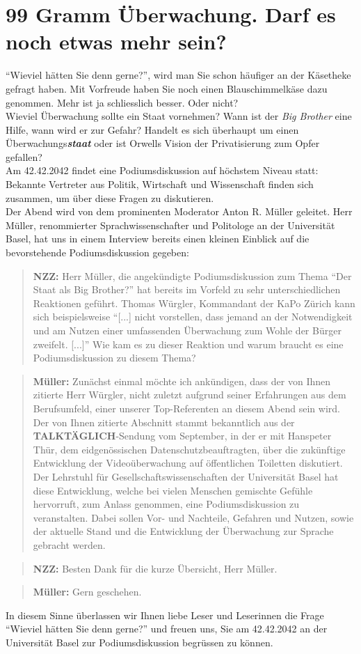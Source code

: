 \section*{99 Gramm Überwachung. Darf es noch etwas mehr sein?}
"`Wieviel hätten Sie denn gerne?"', wird man Sie schon
häufiger an der Käsetheke gefragt haben. Mit Vorfreude haben
Sie noch einen Blauschimmelkäse dazu genommen. Mehr ist ja
schliesslich besser. Oder nicht?\\
Wieviel Überwachung sollte ein Staat vornehmen? Wann ist
der \textit{Big Brother} eine Hilfe, wann wird er zur Gefahr?
Handelt es sich überhaupt um einen Überwachungs\textbf{\textit{staat}}
oder ist Orwells Vision der Privatisierung zum Opfer gefallen?\\
Am 42.42.2042 findet eine Podiumsdiskussion auf höchstem Niveau statt:
Bekannte Vertreter aus Politik, Wirtschaft
und Wissenschaft finden sich zusammen, um über diese Fragen zu diskutieren.\\ 
Der Abend wird von dem prominenten Moderator Anton R. Müller
geleitet. Herr Müller, renommierter Sprachwissenschafter und Politologe
an der Universität Basel, hat uns in
einem Interview bereits einen kleinen Einblick auf die
bevorstehende Podiumsdiskussion gegeben:

\begin{quote}
\textbf{NZZ:} Herr Müller, die angekündigte Podiumsdiskussion zum Thema
"`Der Staat als Big Brother?"' hat bereits im Vorfeld zu
sehr unterschiedlichen Reaktionen geführt. Thomas Würgler, 
Kommandant der KaPo Zürich kann sich beispielsweise "`[...] nicht
 vorstellen, dass jemand an der Notwendigkeit und am Nutzen
 einer umfassenden Überwachung zum Wohle der Bürger zweifelt. [...]"'
Wie kam es zu dieser Reaktion und warum braucht es eine  
Podiumsdiskussion zu diesem Thema?
\end{quote}
\begin{quote}
\textbf{Müller:} Zunächst einmal möchte ich ankündigen, dass
der von Ihnen zitierte Herr Würgler, nicht zuletzt aufgrund
seiner Erfahrungen aus dem Berufsumfeld, einer unserer Top-Refe\-renten
an diesem Abend sein wird. Der von Ihnen zitierte Abschnitt stammt
bekanntlich aus der \textbf{TALKTÄGLICH}-Sendung vom September,
in der er mit Hanspeter Thür,
dem eidgenössischen Datenschutzbeauftragten, über die zukünftige
Entwicklung der Videoüberwachung auf öffentlichen Toiletten
diskutiert.
Der Lehrstuhl für Gesellschaftswissenschaften der Universität Basel
hat diese Entwicklung, welche bei vielen Menschen gemischte Gefühle
hervorruft, zum Anlass genommen, eine Podiumsdiskussion zu veranstalten.
Dabei sollen Vor- und Nachteile, Gefahren und Nutzen, sowie der aktuelle
 Stand und die Entwicklung der Überwachung zur Sprache gebracht werden.
\end{quote}
\begin{quote}
\textbf{NZZ:} Besten Dank für die kurze Übersicht,
Herr Müller.
\end{quote}
\begin{quote}
\textbf{Müller:} Gern geschehen.
\end{quote}
In diesem Sinne überlassen wir Ihnen liebe Leser und Leserinnen
die Frage "`Wieviel hätten Sie denn gerne?"' und freuen uns, Sie am
42.42.2042 an der Universität Basel zur Podiumsdiskussion
begrüssen zu können.
